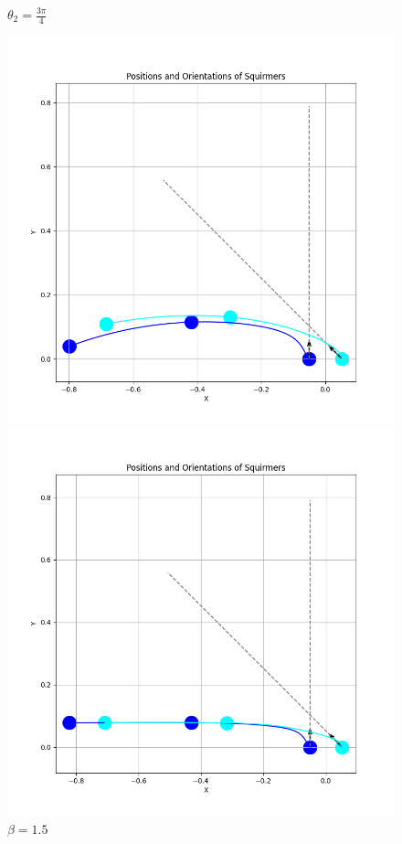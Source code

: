 \documentclass{article}
\begin{document}
 \begin{figure}[H]
    \centering
    \textbf{$\theta_2 = \frac{3\pi}{4}$}\par\medskip
    \begin{minipage}{0.49\textwidth}
        \includegraphics[width=1.1\textwidth]{graphs/simulations/sim_sq_sq/beta1_5/3pi_4_.png}
        \caption{\footnotesize $\beta = 1.5$}
    \end{minipage}\hfill
    \begin{minipage}{0.49\textwidth}
        \includegraphics[width=1.1\textwidth]{graphs/simulations/sim_sq_sq/beta3/3pi_4_.png}

\end{minipage}
\end{figure}
\end{document}

